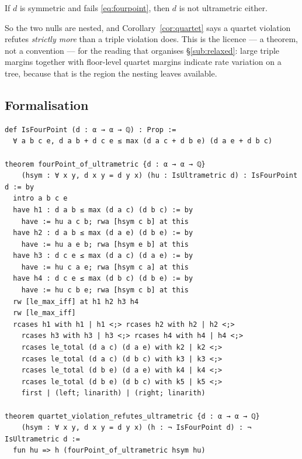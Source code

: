 \begin{corollary}\label{cor:quartet}
If $d$ is symmetric and fails \eqref{eq:fourpoint}, then $d$ is not ultrametric
either.
\end{corollary}

So the two nulls are nested, and Corollary~\ref{cor:quartet} says a quartet
violation refutes \emph{strictly more} than a triple violation does. This is the
licence --- a theorem, not a convention --- for the reading that organises
\S\ref{sub:relaxed}: large triple margins together with floor-level quartet
margins indicate rate variation on a tree, because that is the region the
nesting leaves available.

\subsection{Formalisation}

\begin{lstlisting}[caption={The nesting theorem and its corollary, from \texttt{formal/ANSE/GeneticaReticulataTree.lean}. The \texttt{rcases} chain is the $2^4$ case split of the proof above, with four more splits on the order of the bounding quantities; \texttt{linarith} closes each branch.},label={lst:nesting}]
def IsFourPoint (d : α → α → ℚ) : Prop :=
  ∀ a b c e, d a b + d c e ≤ max (d a c + d b e) (d a e + d b c)

theorem fourPoint_of_ultrametric {d : α → α → ℚ}
    (hsym : ∀ x y, d x y = d y x) (hu : IsUltrametric d) : IsFourPoint d := by
  intro a b c e
  have h1 : d a b ≤ max (d a c) (d b c) := by
    have := hu a c b; rwa [hsym c b] at this
  have h2 : d a b ≤ max (d a e) (d b e) := by
    have := hu a e b; rwa [hsym e b] at this
  have h3 : d c e ≤ max (d a c) (d a e) := by
    have := hu c a e; rwa [hsym c a] at this
  have h4 : d c e ≤ max (d b c) (d b e) := by
    have := hu c b e; rwa [hsym c b] at this
  rw [le_max_iff] at h1 h2 h3 h4
  rw [le_max_iff]
  rcases h1 with h1 | h1 <;> rcases h2 with h2 | h2 <;>
    rcases h3 with h3 | h3 <;> rcases h4 with h4 | h4 <;>
    rcases le_total (d a c) (d a e) with k2 | k2 <;>
    rcases le_total (d a c) (d b c) with k3 | k3 <;>
    rcases le_total (d b e) (d a e) with k4 | k4 <;>
    rcases le_total (d b e) (d b c) with k5 | k5 <;>
    first | (left; linarith) | (right; linarith)

theorem quartet_violation_refutes_ultrametric {d : α → α → ℚ}
    (hsym : ∀ x y, d x y = d y x) (h : ¬ IsFourPoint d) : ¬ IsUltrametric d :=
  fun hu => h (fourPoint_of_ultrametric hsym hu)
\end{lstlisting}

